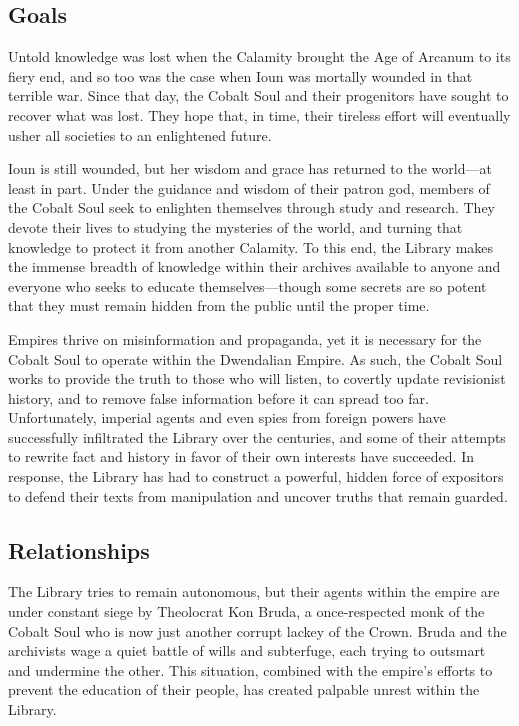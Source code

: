 \documentclass[10pt,a4paper,twoside,bg=print,twocolumn,openany,nodeprecatedcode]{dndbook}
\begin{document}
\subsection{Goals}
Untold knowledge was lost when the Calamity brought the Age of Arcanum to its fiery end, and so too was the case when Ioun was mortally wounded in that terrible war. Since that day, the Cobalt Soul and their progenitors have sought to recover what was lost. They hope that, in time, their tireless effort will eventually usher all societies to an enlightened future.

Ioun is still wounded, but her wisdom and grace has returned to the world—at least in part. Under the guidance and wisdom of their patron god, members of the Cobalt Soul seek to enlighten themselves through study and research. They devote their lives to studying the mysteries of the world, and turning that knowledge to protect it from another Calamity. To this end, the Library makes the immense breadth of knowledge within their archives available to anyone and everyone who seeks to educate themselves—though some secrets are so potent that they must remain hidden from the public until the proper time.

Empires thrive on misinformation and propaganda, yet it is necessary for the Cobalt Soul to operate within the Dwendalian Empire. As such, the Cobalt Soul works to provide the truth to those who will listen, to covertly update revisionist history, and to remove false information before it can spread too far. Unfortunately, imperial agents and even spies from foreign powers have successfully infiltrated the Library over the centuries, and some of their attempts to rewrite fact and history in favor of their own interests have succeeded. In response, the Library has had to construct a powerful, hidden force of expositors to defend their texts from manipulation and uncover truths that remain guarded.

\subsection{Relationships}
The Library tries to remain autonomous, but their agents within the empire are under constant siege by Theolocrat Kon Bruda, a once-respected monk of the Cobalt Soul who is now just another corrupt lackey of the Crown. Bruda and the archivists wage a quiet battle of wills and subterfuge, each trying to outsmart and undermine the other. This situation, combined with the empire's efforts to prevent the education of their people, has created palpable unrest within the Library.
\end{document}
